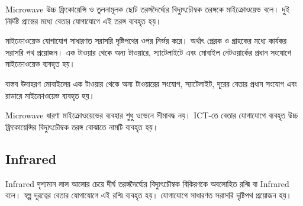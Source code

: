 \begin{definitionbox}{Microwave}
উচ্চ ফ্রিকোয়েন্সি ও তুলনামূলক ছোট তরঙ্গদৈর্ঘ্যের বিদ্যুৎচৌম্বক তরঙ্গকে মাইক্রোওয়েভ বলে। দুই নির্দিষ্ট প্রান্তের মধ্যে বেতার যোগাযোগে এই তরঙ্গ ব্যবহৃত হয়।
\end{definitionbox}

মাইক্রোওয়েভ যোগাযোগ সাধারণত সরাসরি দৃষ্টিপথের ওপর নির্ভর করে। অর্থাৎ প্রেরক ও গ্রাহকের মধ্যে কার্যকর সরাসরি পথ প্রয়োজন। এক টাওয়ার থেকে অন্য টাওয়ারে, স্যাটেলাইটে এবং মোবাইল নেটওয়ার্কের প্রধান সংযোগে মাইক্রোওয়েভ ব্যবহৃত হয়।




\begin{examplebox}{বাস্তব উদাহরণ}
মোবাইলের এক টাওয়ার থেকে অন্য টাওয়ারের সংযোগ, স্যাটেলাইট, দূরের বেতার প্রধান সংযোগ এবং রাডারে মাইক্রোওয়েভ ব্যবহৃত হয়।
\end{examplebox}

\begin{mistakebox}{Microwave ধারণা}
মাইক্রোওয়েভের ব্যবহার শুধু ওভেনে সীমাবদ্ধ নয়। ICT-তে বেতার যোগাযোগে ব্যবহৃত উচ্চ ফ্রিকোয়েন্সির বিদ্যুৎচৌম্বক তরঙ্গ বোঝাতে নামটি ব্যবহৃত হয়।
\end{mistakebox}

\subsection{Infrared}

\begin{definitionbox}{Infrared}
দৃশ্যমান লাল আলোর চেয়ে দীর্ঘ তরঙ্গদৈর্ঘ্যের বিদ্যুৎচৌম্বক বিকিরণকে অবলোহিত রশ্মি বা Infrared বলে। স্বল্প দূরত্বের বেতার যোগাযোগে এই রশ্মি ব্যবহৃত হয়। যোগাযোগে সাধারণত সরাসরি দৃষ্টিপথ প্রয়োজন হয়।
\end{definitionbox}

